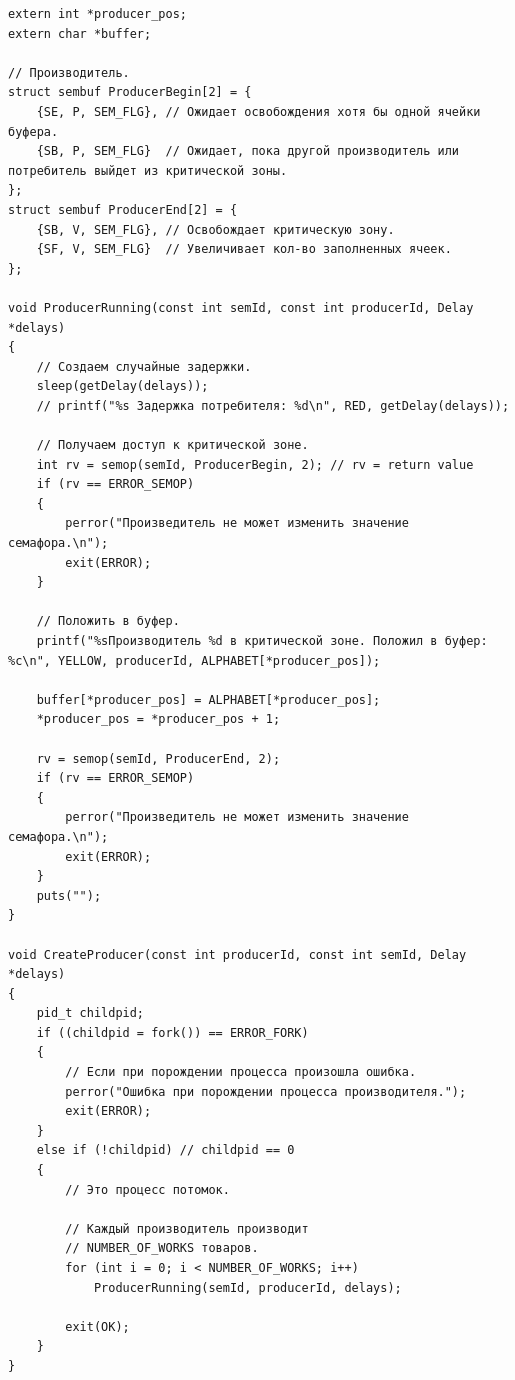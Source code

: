 \begin{lstlisting}[label=some-code,caption=Производитель]
extern int *producer_pos;
extern char *buffer;

// Производитель.
struct sembuf ProducerBegin[2] = {
	{SE, P, SEM_FLG}, // Ожидает освобождения хотя бы одной ячейки буфера.
	{SB, P, SEM_FLG}  // Ожидает, пока другой производитель или потребитель выйдет из критической зоны.
};
struct sembuf ProducerEnd[2] = {
	{SB, V, SEM_FLG}, // Освобождает критическую зону.
	{SF, V, SEM_FLG}  // Увеличивает кол-во заполненных ячеек.
};

void ProducerRunning(const int semId, const int producerId, Delay *delays)
{
	// Создаем случайные задержки.
	sleep(getDelay(delays));
	// printf("%s Задержка потребителя: %d\n", RED, getDelay(delays));

	// Получаем доступ к критической зоне.
	int rv = semop(semId, ProducerBegin, 2); // rv = return value
	if (rv == ERROR_SEMOP)
	{
		perror("Произведитель не может изменить значение семафора.\n");
		exit(ERROR);
	}

	// Положить в буфер.
	printf("%sПроизводитель %d в критической зоне. Положил в буфер: %c\n", YELLOW, producerId, ALPHABET[*producer_pos]);

	buffer[*producer_pos] = ALPHABET[*producer_pos];
	*producer_pos = *producer_pos + 1;

	rv = semop(semId, ProducerEnd, 2);
	if (rv == ERROR_SEMOP)
	{
		perror("Произведитель не может изменить значение семафора.\n");
		exit(ERROR);
	}
	puts("");
}

void CreateProducer(const int producerId, const int semId, Delay *delays)
{
	pid_t childpid;
	if ((childpid = fork()) == ERROR_FORK)
	{
		// Если при порождении процесса произошла ошибка.
		perror("Ошибка при порождении процесса производителя.");
		exit(ERROR);
	}
	else if (!childpid) // childpid == 0
	{
		// Это процесс потомок.

		// Каждый производитель производит
		// NUMBER_OF_WORKS товаров.
		for (int i = 0; i < NUMBER_OF_WORKS; i++)
			ProducerRunning(semId, producerId, delays);

		exit(OK);
	}
}
\end{lstlisting}

